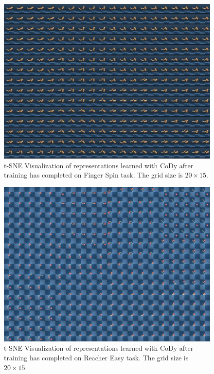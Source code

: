 \documentclass[a4paper,12pt]{article}
\begin{document}
\begin{figure}
\centering
\includegraphics[width=\textwidth]{vis/vis-finger-2021-10-19.pdf}
\caption{t-SNE Visualization of representations learned with CoDy after training has completed on Finger Spin task. The grid size is $20 \times 15$.}
\label{vis:finger}
\end{figure}

\begin{figure}
\centering
\includegraphics[width=\textwidth]{vis/vis-reacher-2021-10-19.pdf}
\caption{t-SNE Visualization of representations learned with CoDy after training has completed on Reacher Easy task. The grid size is $20 \times 15$.}
\label{vis:reacher}
\end{figure}
\end{document}
